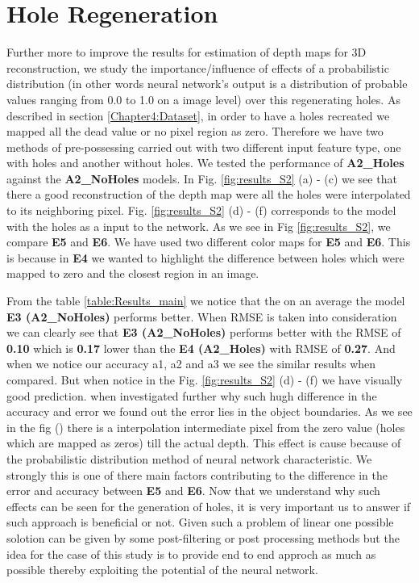 \newpage
 \section{Hole Regeneration}
 \label{Chapter6:Hole_Regeneration}
Further more to improve the results for estimation of depth maps for 3D reconstruction, we study the importance/influence of effects of a probabilistic distribution (in other words neural network's output is a distribution of probable values ranging from 0.0 to 1.0 on a image level) over this regenerating holes. As described in section \ref{Chapter4:Dataset}, in order to have a holes recreated we mapped all the dead value or no pixel region as zero. Therefore we have two methods of pre-possessing carried out with two different input feature type, one with holes and another without holes. We tested the performance of \textbf{A2\_Holes} against the \textbf{A2\_NoHoles} models. In Fig. \ref{fig:results_S2} (a) - (c) we see that there a good reconstruction of the depth map were all the holes were interpolated to its neighboring pixel.  Fig. \ref{fig:results_S2} (d) - (f)  corresponds to the model with the holes as a input to the network. As we see in Fig \ref{fig:results_S2}, we compare \textbf{E5} and \textbf{E6}. We have used two different color maps for \textbf{E5} and \textbf{E6}. This is because in \textbf{E4} we wanted to highlight the difference between holes which were mapped to zero and the closest region in an image. 

From the table \ref{table:Results_main} we notice that the on an average the model \textbf{E3 (A2\_NoHoles)} performs better. When RMSE is taken into consideration we can clearly see that \textbf{E3 (A2\_NoHoles)} performs better with the RMSE of \textbf{0.10} which is \textbf{0.17} lower than the \textbf{E4 (A2\_Holes)} with RMSE of \textbf{0.27}. And when we notice our accuracy a1, a2 and a3 we see the similar results when compared. But when notice in the Fig. \ref{fig:results_S2} (d) - (f) we have visually good prediction. when investigated further why such hugh difference in the accuracy and error we found out the error lies in the object boundaries. As we see in the fig () there is a interpolation intermediate pixel from the zero value (holes which are mapped as zeros) till the actual depth. This effect is cause because of the probabilistic distribution method of neural network characteristic. We strongly this is one of there main factors contributing to the difference in the error and accuracy between \textbf{E5} and \textbf{E6}. Now that we understand why such effects can be seen for the generation of holes, it is very important us to answer if such approach is beneficial or not. Given such a problem of linear  one possible solotion can be given by some post-filtering or post processing methods but the idea for the case of this study is to provide end to end approch as much as possible thereby exploiting the potential of the neural network. 

